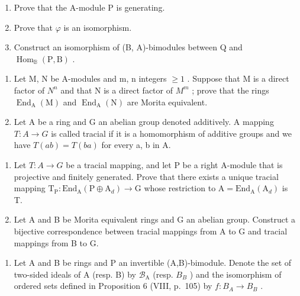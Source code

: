 \begin{enumerate}
\def\labelenumi{\alph{enumi})}
\item
  Prove that the A-module P is generating.
\item
  Prove that \(\varphi\) is an isomorphism.
\item
  Construct an isomorphism of (B, A)-bimodules between Q and \(\operatorname{Hom}_{\mathbb{B}}(\mathrm{P}, \mathrm{B})\) .
\end{enumerate}

\begin{enumerate}
\def\labelenumi{\arabic{enumi})}
\setcounter{enumi}{1}
\item
  Let M, N be A-modules and m, n integers \(\geqslant 1\) . Suppose that M is a direct factor of \(N^{n}\) and that N is a direct factor of \(M^{m}\) ; prove that the rings \(\operatorname{End}_{\mathrm{A}}(\mathrm{M})\) and \(\operatorname{End}_{\mathrm{A}}(\mathrm{N})\) are Morita equivalent.
\item
  Let A be a ring and G an abelian group denoted additively. A mapping \(T: A \to G\) is called tracial if it is a homomorphism of additive groups and we have \(T(ab) = T(ba)\) for every a, b in A.
\end{enumerate}

\begin{enumerate}
\def\labelenumi{\alph{enumi})}
\item
  Let \(T : A \to G\) be a tracial mapping, and let P be a right A-module that is projective and finitely generated. Prove that there exists a unique tracial mapping \(\mathrm{T}_{\mathrm{P}} : \mathrm{End}_{\mathrm{A}}(\mathrm{P} \oplus \mathrm{A}_{d}) \to \mathrm{G}\) whose restriction to \(\mathrm{A} = \mathrm{End}_{\mathrm{A}}(\mathrm{A}_{d})\) is T.
\item
  Let A and B be Morita equivalent rings and G an abelian group. Construct a bijective correspondence between tracial mappings from A to G and tracial mappings from B to G.
\end{enumerate}

\begin{enumerate}
\def\labelenumi{\arabic{enumi})}
\setcounter{enumi}{3}
\tightlist
\item
  Let A and B be rings and P an invertible (A,B)-bimodule. Denote the set of two-sided ideals of A (resp. B) by \(\mathcal{B}_{\mathrm{A}}\) (resp. \(B_{B}\) ) and the isomorphism of ordered sets defined in Proposition 6 (VIII, p.~105) by \(f: B_{A} \to B_{B}\) .
\end{enumerate}

